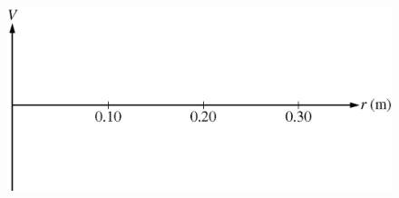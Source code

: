 \begin{parts}
\begin{figure}[h]
\centering
\includegraphics[scale=0.3]{images/img-015-028.png}
\end{figure}

\end{parts}
 